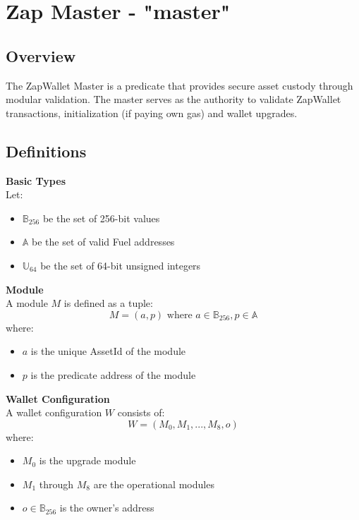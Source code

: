 \newpage
\section{Zap Master - {\ttfamily "master"}}
\label{sec:zapmaster_predicate}


\subsection{Overview}
The ZapWallet Master is a predicate that provides secure asset custody through modular validation. The master serves as the authority to validate
ZapWallet transactions, initialization (if paying own gas) and wallet upgrades.

\subsection{Definitions}

\textbf{Basic Types}\\
Let:
\begin{itemize}
    \item $\mathbb{B}_{256}$ be the set of 256-bit values
    \item $\mathbb{A}$ be the set of valid Fuel addresses
    \item $\mathbb{U}_{64}$ be the set of 64-bit unsigned integers
\end{itemize}

\textbf{Module}\\
A module $M$ is defined as a tuple:
\[ M = (a, p) \text{ where } a \in \mathbb{B}_{256}, p \in \mathbb{A} \]
where:
\begin{itemize}
    \item $a$ is the unique AssetId of the module
    \item $p$ is the predicate address of the module
\end{itemize}

\textbf{Wallet Configuration}\\
A wallet configuration $W$ consists of:
\[ W = (M_0, M_1, ..., M_8, o) \]
where:
\begin{itemize}
    \item $M_0$ is the upgrade module
    \item $M_1$ through $M_8$ are the operational modules
    \item $o \in \mathbb{B}_{256}$ is the owner's address
\end{itemize}




